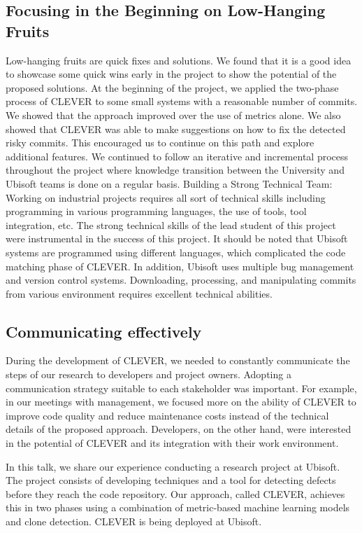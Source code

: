 \documentclass[12pt]{report}
\begin{document}
\subsection{Focusing in the Beginning on Low-Hanging
Fruits}\label{focusing-in-the-beginning-on-low-hanging-fruits}

Low-hanging fruits are quick fixes and solutions. We found that it is a
good idea to showcase some quick wins early in the project to show the
potential of the proposed solutions. At the beginning of the project, we
applied the two-phase process of CLEVER to some small systems with a
reasonable number of commits. We showed that the approach improved over
the use of metrics alone. We also showed that CLEVER was able to make
suggestions on how to fix the detected risky commits. This encouraged us
to continue on this path and explore additional features. We continued
to follow an iterative and incremental process throughout the project
where knowledge transition between the University and Ubisoft teams is
done on a regular basis. Building a Strong Technical Team: Working on
industrial projects requires all sort of technical skills including
programming in various programming languages, the use of tools, tool
integration, etc. The strong technical skills of the lead student of
this project were instrumental in the success of this project. It should
be noted that Ubisoft systems are programmed using different languages,
which complicated the code matching phase of CLEVER. In addition,
Ubisoft uses multiple bug management and version control systems.
Downloading, processing, and manipulating commits from various
environment requires excellent technical abilities.

\subsection{Communicating effectively}\label{communicating-effectively}

During the development of CLEVER, we needed to constantly communicate
the steps of our research to developers and project owners. Adopting a
communication strategy suitable to each stakeholder was important. For
example, in our meetings with management, we focused more on the ability
of CLEVER to improve code quality and reduce maintenance costs instead
of the technical details of the proposed approach. Developers, on the
other hand, were interested in the potential of CLEVER and its
integration with their work environment.

In this talk, we share our experience conducting a research project at
Ubisoft. The project consists of developing techniques and a tool for
detecting defects before they reach the code repository. Our approach,
called CLEVER, achieves this in two phases using a combination of
metric-based machine learning models and clone detection. CLEVER is
being deployed at Ubisoft.
\end{document}
